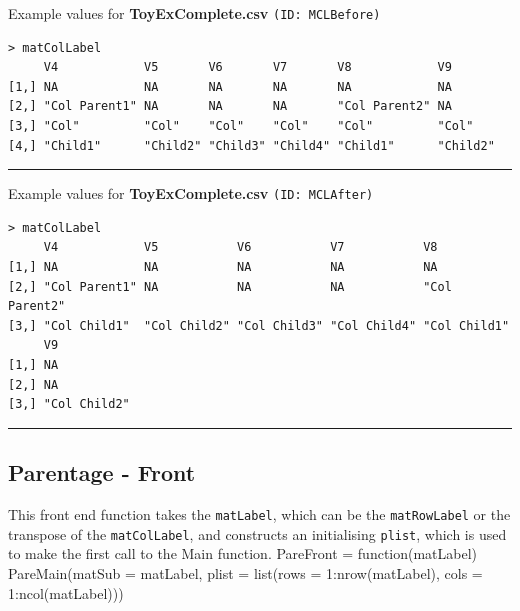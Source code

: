 \documentclass[a4paper]{article}
\begin{document}
Example values for \textbf{ToyExComplete.csv} \texttt{(ID: MCLBefore)}
\begin{verbatim}
> matColLabel
     V4            V5       V6       V7       V8            V9      
[1,] NA            NA       NA       NA       NA            NA      
[2,] "Col Parent1" NA       NA       NA       "Col Parent2" NA      
[3,] "Col"         "Col"    "Col"    "Col"    "Col"         "Col"   
[4,] "Child1"      "Child2" "Child3" "Child4" "Child1"      "Child2"
\end{verbatim}
\vspace{-1.5em}
\noindent\rule{0.25\textwidth}{0.4pt}
\vspace{0.5em}

Example values for \textbf{ToyExComplete.csv} \texttt{(ID: MCLAfter)}
\begin{verbatim}
> matColLabel
     V4            V5           V6           V7           V8           
[1,] NA            NA           NA           NA           NA           
[2,] "Col Parent1" NA           NA           NA           "Col Parent2"
[3,] "Col Child1"  "Col Child2" "Col Child3" "Col Child4" "Col Child1" 
     V9          
[1,] NA          
[2,] NA          
[3,] "Col Child2"
\end{verbatim}
\vspace{-1.5em}
\noindent\rule{0.25\textwidth}{0.4pt}
\vspace{0.5em}

\subsection{Parentage - Front}
\label{sec:PareFront}
This front end function takes the \verb|matLabel|, which can be the
\verb|matRowLabel| or the transpose of the \verb|matColLabel|, and
constructs an initialising \verb|plist|, which is used to make the
first call to the Main function.
\nwenddocs{}\endmoddef
PareFront =
  function(matLabel)
  PareMain(matSub = matLabel, plist =
           list(rows = 1:nrow(matLabel), cols = 1:ncol(matLabel)))
\eatline
{}\nwendcode{}\nwdocspar
\end{document}
